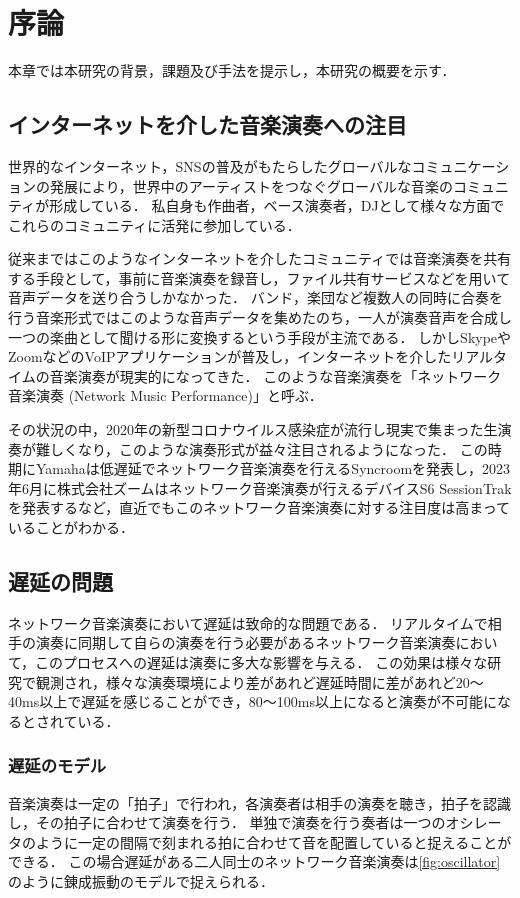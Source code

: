 \chapter{序論}
\label{introduction}

本章では本研究の背景，課題及び手法を提示し，本研究の概要を示す．

\section{インターネットを介した音楽演奏への注目}
世界的なインターネット，SNSの普及がもたらしたグローバルなコミュニケーションの発展により，世界中のアーティストをつなぐグローバルな音楽のコミュニティが形成している．
私自身も作曲者，ベース演奏者，DJとして様々な方面でこれらのコミュニティに活発に参加している．

従来まではこのようなインターネットを介したコミュニティでは音楽演奏を共有する手段として，事前に音楽演奏を録音し，ファイル共有サービスなどを用いて音声データを送り合うしかなかった．
バンド，楽団など複数人の同時に合奏を行う音楽形式ではこのような音声データを集めたのち，一人が演奏音声を合成し一つの楽曲として聞ける形に変換するという手段が主流である．
しかしSkypeやZoomなどのVoIPアプリケーションが普及し，インターネットを介したリアルタイムの音楽演奏が現実的になってきた．
このような音楽演奏を「ネットワーク音楽演奏 (Network Music Performance)\cite{lazzaro}\cite{nmpbook}」と呼ぶ．

その状況の中，2020年の新型コロナウイルス感染症が流行し現実で集まった生演奏が難しくなり，このような演奏形式が益々注目されるようになった．
この時期にYamahaは低遅延でネットワーク音楽演奏を行えるSyncroom\cite{syncroom}\cite{syncroom:press}を発表し，2023年6月に株式会社ズームはネットワーク音楽演奏が行えるデバイスS6 SessionTrak\cite{sessiontrak}を発表するなど，直近でもこのネットワーク音楽演奏に対する注目度は高まっていることがわかる．

\section{遅延の問題}
ネットワーク音楽演奏において遅延は致命的な問題である．
リアルタイムで相手の演奏に同期して自らの演奏を行う必要があるネットワーク音楽演奏において，このプロセスへの遅延は演奏に多大な影響を与える．
この効果は様々な研究で観測され，様々な演奏環境により差があれど遅延時間に差があれど20〜40ms以上で遅延を感じることができ，80〜100ms以上になると演奏が不可能になるとされている\cite{latency:effect}\cite{latency:ipsj}．

\subsection{遅延のモデル}
音楽演奏は一定の「拍子」で行われ，各演奏者は相手の演奏を聴き，拍子を認識し，その拍子に合わせて演奏を行う．
単独で演奏を行う奏者は一つのオシレータのように一定の間隔で刻まれる拍に合わせて音を配置していると捉えることができる．
この場合遅延がある二人同士のネットワーク音楽演奏は\ref{fig:oscillator}のように錬成振動のモデルで捉えられる．

